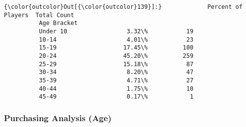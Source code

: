 \documentclass[11pt]{article}
\begin{document}
\begin{Verbatim}[commandchars=\\\{\}]
{\color{outcolor}Out[{\color{outcolor}139}]:}             Percent of Players  Total Count
          Age Bracket                                
          Under 10                 3.32\%           19
          10-14                    4.01\%           23
          15-19                   17.45\%          100
          20-24                   45.20\%          259
          25-29                   15.18\%           87
          30-34                    8.20\%           47
          35-39                    4.71\%           27
          40-44                    1.75\%           10
          45-49                    0.17\%            1
\end{Verbatim}
            
    \subsubsection{Purchasing Analysis (Age)}\label{purchasing-analysis-age}
\end{document}
